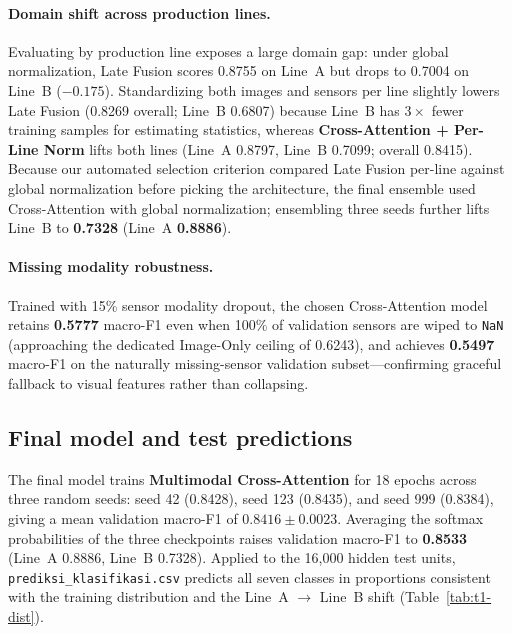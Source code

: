 \paragraph{Domain shift across production lines.} Evaluating by production line exposes a large
domain gap: under global normalization, Late Fusion scores 0.8755 on Line~A but drops to 0.7004 on
Line~B ($-0.175$). Standardizing both images and sensors per line slightly lowers Late Fusion
(0.8269 overall; Line~B 0.6807) because Line~B has $3\times$ fewer training samples for estimating
statistics, whereas \textbf{Cross-Attention + Per-Line Norm} lifts both lines (Line~A 0.8797, Line~B
0.7099; overall 0.8415). Because our automated selection criterion compared Late Fusion per-line
against global normalization before picking the architecture, the final ensemble used
Cross-Attention with global normalization; ensembling three seeds further lifts Line~B to
\textbf{0.7328} (Line~A \textbf{0.8886}).

\paragraph{Missing modality robustness.} Trained with 15\% sensor modality dropout, the chosen
Cross-Attention model retains \textbf{0.5777} macro-F1 even when 100\% of validation sensors are
wiped to \texttt{NaN} (approaching the dedicated Image-Only ceiling of 0.6243), and achieves
\textbf{0.5497} macro-F1 on the naturally missing-sensor validation subset---confirming graceful
fallback to visual features rather than collapsing.

\subsection{Final model and test predictions}
\label{sec:t1-final}

The final model trains \textbf{Multimodal Cross-Attention} for 18 epochs across three random seeds:
seed 42 (0.8428), seed 123 (0.8435), and seed 999 (0.8384), giving a mean validation macro-F1 of
$0.8416 \pm 0.0023$. Averaging the softmax probabilities of the three checkpoints raises validation
macro-F1 to \textbf{0.8533} (Line~A 0.8886, Line~B 0.7328). Applied to the 16{,}000 hidden test
units, \texttt{prediksi\_klasifikasi.csv} predicts all seven classes in proportions consistent with
the training distribution and the Line~A $\to$ Line~B shift (Table~\ref{tab:t1-dist}).
